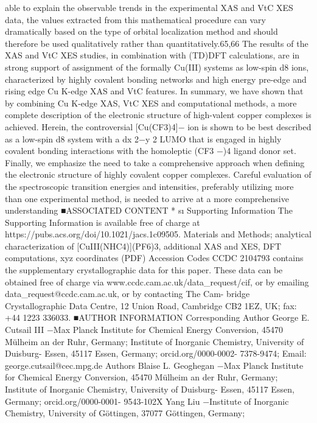 \documentclass{article}
\begin{document}
able to explain the observable trends in the experimental XAS
and VtC XES data, the values extracted from this mathematical
procedure can vary dramatically based on the type of orbital
localization method and should therefore be used qualitatively
rather than quantitatively.65,66 The results of the XAS and VtC
XES studies, in combination with (TD)DFT calculations, are
in strong support of assignment of the formally Cu(III)
systems as low-spin d8 ions, characterized by highly covalent
bonding networks and high energy pre-edge and rising edge
Cu K-edge XAS and VtC features.
In summary, we have shown that by combining Cu K-edge
XAS, VtC XES and computational methods, a more complete
description of the electronic structure of high-valent copper
complexes is achieved. Herein, the controversial [Cu(CF3)4]−
ion is shown to be best described as a low-spin d8 system with
a dx
2−y
2 LUMO that is engaged in highly covalent bonding
interactions with the homoleptic (CF3
−)4 ligand donor set.
Finally, we emphasize the need to take a comprehensive
approach when deﬁning the electronic structure of highly
covalent copper complexes. Careful evaluation of the
spectroscopic transition energies and intensities, preferably
utilizing more than one experimental method, is needed to
arrive at a more comprehensive understanding
■ASSOCIATED CONTENT
*
sı Supporting Information
The Supporting Information is available free of charge at
https://pubs.acs.org/doi/10.1021/jacs.1c09505.
Materials and Methods; analytical characterization of
[CuIII(NHC4)](PF6)3, additional XAS and XES, DFT
computations, xyz coordinates (PDF)
Accession Codes
CCDC 2104793 contains the supplementary crystallographic
data for this paper. These data can be obtained free of charge
via www.ccdc.cam.ac.uk/data\_request/cif, or by emailing
data\_request@ccdc.cam.ac.uk, or by contacting The Cam-
bridge Crystallographic Data Centre, 12 Union Road,
Cambridge CB2 1EZ, UK; fax: +44 1223 336033.
■AUTHOR INFORMATION
Corresponding Author
George E. Cutsail III −Max Planck Institute for Chemical
Energy Conversion, 45470 Mülheim an der Ruhr, Germany;
Institute of Inorganic Chemistry, University of Duisburg-
Essen, 45117 Essen, Germany;
orcid.org/0000-0002-
7378-9474; Email: george.cutsail@cec.mpg.de
Authors
Blaise L. Geoghegan −Max Planck Institute for Chemical
Energy Conversion, 45470 Mülheim an der Ruhr, Germany;
Institute of Inorganic Chemistry, University of Duisburg-
Essen, 45117 Essen, Germany;
orcid.org/0000-0001-
9543-102X
Yang Liu −Institute of Inorganic Chemistry, University of
Göttingen, 37077 Göttingen, Germany;
\end{document}
